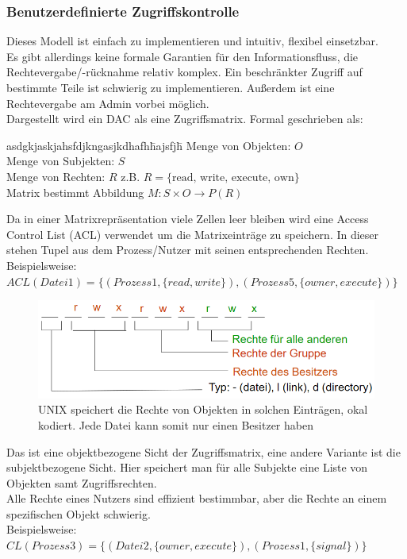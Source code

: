 \documentclass[a4paper,12pt,leqno]{article}
\begin{document}
\subsubsection{Benutzerdefinierte Zugriffskontrolle}
Dieses Modell ist einfach zu implementieren und intuitiv, flexibel einsetzbar.\\
Es gibt allerdings keine formale Garantien für den Informationsfluss, die Rechtevergabe/-rücknahme relativ komplex. Ein beschränkter Zugriff auf bestimmte Teile ist schwierig zu implementieren. Außerdem ist eine Rechtevergabe am Admin vorbei möglich.\\

Dargestellt wird ein DAC als eine Zugriffsmatrix. Formal geschrieben als:
\begin{tabbing}
asdgkjaskjahsfdjkngasjkdhafh\= hajsfjh\=\kill
Menge von Objekten: \> \>   $O$\\
Menge von Subjekten: \>   \>    $S$\\
Menge von Rechten: \>\>$R$ z.B. $R = \{\textrm{read, write, execute, own}\}$\\
Matrix bestimmt Abbildung \>\> $M: S\times O\rightarrow P(R)$
\end{tabbing}
Da in einer Matrixrepräsentation viele Zellen leer bleiben wird eine Access Control List (ACL) verwendet um die Matrixeinträge zu speichern. In dieser stehen Tupel aus dem Prozess/Nutzer mit seinen entsprechenden Rechten.\\
Beispielsweise: $ACL(Datei1)=\{(Prozess1, \{read, write\}),(Prozess5,\{owner,execute\})\}$\\
\begin{figure}
\centering
\includegraphics[scale=0.7]{Grafiken/Unix-ACL.png}
\caption{UNIX speichert die Rechte von Objekten in solchen Einträgen, okal kodiert. Jede Datei kann somit nur einen Besitzer haben}
\end{figure}
Das ist eine objektbezogene Sicht der Zugriffsmatrix, eine andere Variante ist die subjektbezogene Sicht. Hier speichert man für alle Subjekte eine Liste von Objekten samt Zugriffsrechten.\\
Alle Rechte eines Nutzers sind effizient bestimmbar, aber die Rechte an einem spezifischen Objekt schwierig.\\
Beispielsweise: $CL(Prozess3)=\{(Datei2,\{owner, execute\}), (Prozess1,\{signal\})\}$
\end{document}
